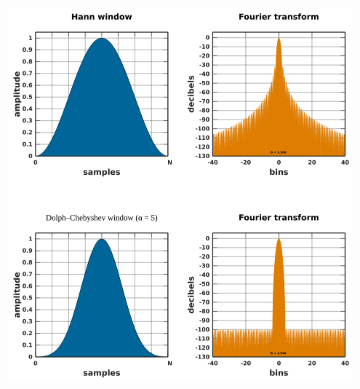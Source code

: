 \documentclass[table]{beamer}
\begin{document}
\begin{frame}
\begin{figure}[H]
\begin{subfigure}{.40\textwidth}
        \end{subfigure}
        \hspace{+4.7mm}
        \begin{subfigure}{.54\textwidth}
            \includegraphics[width=\linewidth]{figures/windows.png}
        \end{subfigure}
    \end{figure}
\end{frame}
\end{document}
